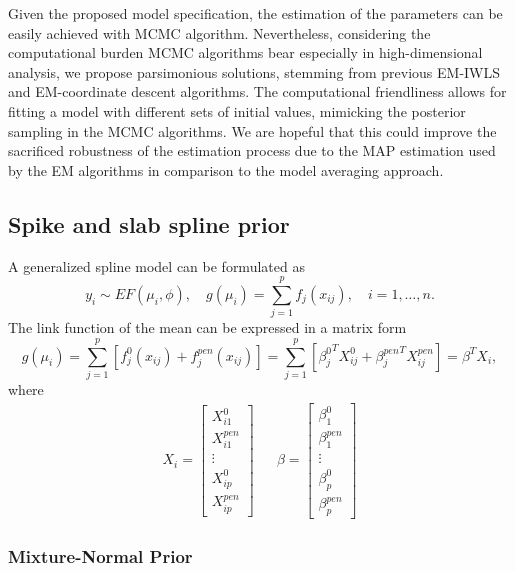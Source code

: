\documentclass[AMA,STIX1COL,]{WileyNJD-v2}
\begin{document}
Given the proposed model specification, the estimation of the parameters
can be easily achieved with MCMC algorithm. Nevertheless, considering
the computational burden MCMC algorithms bear especially in
high-dimensional analysis, we propose parsimonious solutions, stemming
from previous EM-IWLS \citep{Rockova2014a}and EM-coordinate descent
algorithms\citep{Tang2018, Tang2019}. The computational friendliness
allows for fitting a model with different sets of initial values,
mimicking the posterior sampling in the MCMC algorithms. We are hopeful
that this could improve the sacrificed robustness of the estimation
process due to the MAP estimation used by the EM algorithms in
comparison to the model averaging approach.

\hypertarget{spike-and-slab-spline-prior}{%
\subsection{Spike and slab spline
prior}\label{spike-and-slab-spline-prior}}

A generalized spline model can be formulated as \[
y_i \sim EF(\mu_i, \phi), \quad g(\mu_i) = \sum\limits_{j=1}^p f_j(x_{ij}), \quad i = 1, \dots, n.
\] The link function of the mean can be expressed in a matrix form \[
g(\mu_i) = \sum\limits_{j=1}^p\left[f_j^0(x_{ij}) + f_j^{pen}(x_{ij})\right] = \sum\limits_{j=1}^p\left[{\beta_j^0}^T X_{ij}^0 + {\beta_j^{pen}}^T X_{ij}^{pen}\right]
 = \beta^T X_i,
\] where \[
\begin{aligned}
  X_i = \begin{bmatrix}X^0_{i1}\\X^{pen}_{i1}\\\vdots \\X^0_{ip}\\X^{pen}_{ip}\end{bmatrix}
& &
  \beta = \begin{bmatrix}\beta^0_1\\\beta^{pen}_{1}\\\vdots \\\beta^0_{p}\\\beta^{pen}_{p}\end{bmatrix}
\end{aligned}
\]

\hfill\break

\hypertarget{mixture-normal-prior}{%
\subsubsection{Mixture-Normal Prior}\label{mixture-normal-prior}}
\end{document}
